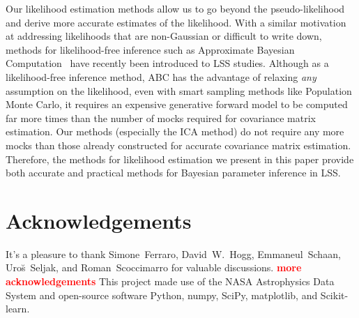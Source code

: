 \documentclass[12pt, letterpaper, preprint]{aastex}
\newcommand{\todo}[1]{{\bf \textcolor{red}{#1}}}
\begin{document}
Our likelihood estimation methods allow us to go beyond the pseudo-likelihood 
and derive more accurate estimates of the likelihood. With a similar 
motivation at addressing likelihoods that are non-Gaussian or difficult to 
write down, methods for likelihood-free inference such as Approximate Bayesian 
Computation~\citep[ABC;][]{hahn2017b,kacprzak2017,alsing2017} have recently 
been introduced to LSS studies. 
Although as a likelihood-free inference method, ABC has the advantage 
of relaxing \emph{any} assumption on the likelihood, even with smart sampling methods 
like Population Monte Carlo, it requires an expensive generative forward 
model to be computed far more times than the number of mocks required for 
covariance matrix estimation. Our methods (especially the ICA method)
do not require any more mocks than those already constructed for accurate covariance 
matrix estimation. Therefore, the methods for likelihood estimation we present
in this paper provide both accurate and practical methods for Bayesian 
parameter inference in LSS. 

\section*{Acknowledgements}
It's a pleasure to thank 
    Simone~Ferraro,
    David~W.~Hogg,
    Emmaneul~Schaan, 
    Uro{\u s}~Seljak,
    and Roman~Scoccimarro 
for valuable discussions.
\todo{more acknowledgements}
This project made use of the NASA Astrophysics Data System
and open-source software Python, numpy, SciPy, matplotlib, 
and Scikit-learn.



\end{document}
